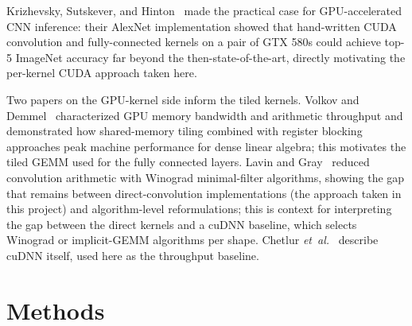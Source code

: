 \documentclass[conference]{IEEEtran}
\begin{document}
Krizhevsky, Sutskever, and Hinton~\cite{krizhevsky2012} made the
practical case for GPU-accelerated CNN inference: their AlexNet
implementation showed that hand-written CUDA convolution and
fully-connected kernels on a pair of GTX 580s could achieve top-5
ImageNet accuracy far beyond the then-state-of-the-art, directly
motivating the per-kernel CUDA approach taken here.

Two papers on the GPU-kernel side inform the tiled kernels. Volkov and Demmel~\cite{volkov2008} characterized GPU
memory bandwidth and arithmetic throughput and demonstrated how
shared-memory tiling combined with register blocking approaches
peak machine performance for dense linear algebra; this motivates the
tiled GEMM used for the fully connected layers. Lavin and
Gray~\cite{lavingray2016} reduced convolution arithmetic with
Winograd minimal-filter algorithms, showing the gap that remains
between direct-convolution implementations (the approach taken in
this project) and algorithm-level reformulations; this is context for
interpreting the gap between the direct kernels and a cuDNN baseline,
which selects Winograd or implicit-GEMM algorithms per shape. Chetlur \emph{et~al.}~\cite{cudnn2014} describe cuDNN itself, used
here as the throughput baseline.

\section{Methods}
\label{sec:methods}
\end{document}
